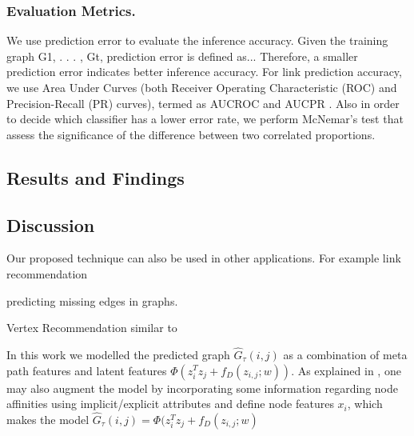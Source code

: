 \subsubsection{Evaluation Metrics.} We use prediction error to evaluate the inference accuracy. Given the training graph G1, . . . , Gt, prediction error is defined as... Therefore, a smaller prediction error indicates better inference accuracy. For link prediction accuracy, we use Area Under Curves (both Receiver Operating Characteristic (ROC) and Precision-Recall (PR) curves), termed as AUCROC and AUCPR \cite{davis2006relationship}. Also in order to decide which classifier has a lower error rate, we perform McNemar's test that assess the significance of the difference between two correlated proportions.


\subsection{Results and Findings}



\subsection{Discussion}



Our proposed technique can also be used in other applications. For example link recommendation 


predicting missing edges in graphs.

Vertex Recommendation similar to \cite{ou2016asymmetric} 


In this work we modelled the predicted graph $ \hat{G}_\tau(i,j)$ as a combination of meta path features and latent features $\Phi(z_{i}^Tz_{j} + f_D(z_{i,j};w))$. As explained in \cite{menon2011link}, one may also augment the model by incorporating some information regarding node affinities using implicit/explicit attributes and define node features $x_i$, which makes the model $\hat{G}_\tau(i,j) = \Phi(z_{i}^Tz_{j} + f_D(z_{i,j};w)$

